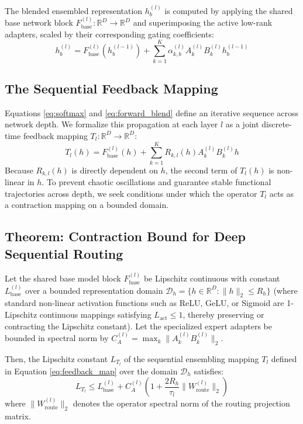 The blended ensembled representation $h^{(l)}_b$ is computed by applying the shared base network block $F_{\text{base}}^{(l)}: \mathbb{R}^D \to \mathbb{R}^D$ and superimposing the active low-rank adapters, scaled by their corresponding gating coefficients:
\begin{equation}
\label{eq:forward_blend}
h^{(l)}_b = F_{\text{base}}^{(l)}\left(h^{(l-1)}_b\right) + \sum_{k=1}^K \alpha^{(l)}_{k, b} A_k^{(l)} B_k^{(l)} h^{(l-1)}_b
\end{equation}

\subsection{The Sequential Feedback Mapping}
Equations \ref{eq:softmax} and \ref{eq:forward_blend} define an iterative sequence across network depth. We formalize this propagation at each layer $l$ as a joint discrete-time feedback mapping $T_l: \mathbb{R}^D \to \mathbb{R}^D$:
\begin{equation}
\label{eq:feedback_map}
T_l(h) = F_{\text{base}}^{(l)}(h) + \sum_{k=1}^K R_{k, l}(h) A_k^{(l)} B_k^{(l)} h
\end{equation}
Because $R_{k, l}(h)$ is directly dependent on $h$, the second term of $T_l(h)$ is non-linear in $h$. To prevent chaotic oscillations and guarantee stable functional trajectories across depth, we seek conditions under which the operator $T_l$ acts as a contraction mapping on a bounded domain.

\subsection{Theorem: Contraction Bound for Deep Sequential Routing}
\label{subsec:theorem}
\begin{theorem}
Let the shared base model block $F_{\text{base}}^{(l)}$ be Lipschitz continuous with constant $L_{\text{base}}^{(l)}$ over a bounded representation domain $\mathcal{D}_h = \{h \in \mathbb{R}^D : \|h\|_2 \le R_h\}$ (where standard non-linear activation functions such as ReLU, GeLU, or Sigmoid are 1-Lipschitz continuous mappings satisfying $L_{\text{act}} \le 1$, thereby preserving or contracting the Lipschitz constant). Let the specialized expert adapters be bounded in spectral norm by $C_A^{(l)} = \max_{k} \|A_k^{(l)} B_k^{(l)}\|_2$. 

Then, the Lipschitz constant $L_{T_l}$ of the sequential ensembling mapping $T_l$ defined in Equation \ref{eq:feedback_map} over the domain $\mathcal{D}_h$ satisfies:
\begin{equation}
L_{T_l} \le L_{\text{base}}^{(l)} + C_A^{(l)} \left( 1 + \frac{2 R_h}{\tau_l} \|W_{\text{route}}^{(l)}\|_2 \right)
\end{equation}
where $\|W_{\text{route}}^{(l)}\|_2$ denotes the operator spectral norm of the routing projection matrix.
\end{theorem}

